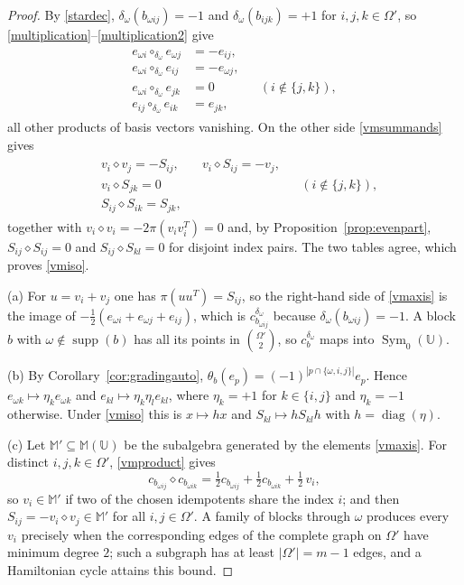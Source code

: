 \documentclass[times,11pt,reqno]{amsproc}
\theoremstyle{definition}
\numberwithin{equation}{section}
\def\ualg{\mathbb{U}}
\DeclareMathOperator{\supp}{supp}
\DeclareMathOperator{\Sym}{Sym}
\def\ualg{\mathbb{U}}
\def\malg{\mathbb{M}}
\newcommand{\vm}[1]{\malg(#1)}
\newcommand{\refl}{h}
\begin{document}
\begin{proof}
By \eqref{stardec}, $\delta_\omega(b_{\omega ij})=-1$ and
$\delta_\omega(b_{ijk})=+1$ for $i,j,k\in\Omega'$, so
\eqref{multiplication}--\eqref{multiplication2} give
\begin{align}
\begin{aligned}
e_{\omega i}\circ_{\delta_\omega} e_{\omega j}&=-e_{ij},
\\
e_{\omega i}\circ_{\delta_\omega} e_{ij}&=-e_{\omega j},
\\
e_{\omega i}\circ_{\delta_\omega} e_{jk}&=0&& (i\notin\{j,k\}),
\\
e_{ij}\circ_{\delta_\omega} e_{ik}&=e_{jk},
\end{aligned}
\end{align}
all other products of basis vectors vanishing. On the other side
\eqref{vmsummands} gives
\begin{align}
\begin{aligned}
&v_i\diamond v_j=-S_{ij},&&
v_i\diamond S_{ij}=-v_j,
\\
&v_i\diamond S_{jk}=0&& &&(i\notin\{j,k\}),
\\
&S_{ij}\diamond S_{ik}=S_{jk},
\end{aligned}
\end{align}
together with $v_i\diamond v_i=-2\pi(v_iv_i^{T})=0$ and, by
Proposition~\ref{prop:evenpart}, $S_{ij}\diamond S_{ij}=0$ and
$S_{ij}\diamond S_{kl}=0$ for disjoint index pairs. The two tables agree,
which proves \eqref{vmiso}.


(a) For $u=v_i+v_j$ one has $\pi(uu^{T})=S_{ij}$, so the right-hand side
of \eqref{vmaxis} is the image of
$-\tfrac12(e_{\omega i}+e_{\omega j}+e_{ij})$, which is
$c^{\delta_\omega}_{b_{\omega ij}}$ because
$\delta_\omega(b_{\omega ij})=-1$. A block $b$ with $\omega\notin\supp(b)$
has all its points in $\binom{\Omega'}{2}$, so $c_b^{\delta_\omega}$ maps
into $\Sym_0(\ualg)$.

(b) By Corollary~\ref{cor:gradingauto},
$\theta_b(e_p)=(-1)^{|p\cap\{\omega,i,j\}|}e_p$. Hence
$e_{\omega k}\mapsto\eta_k e_{\omega k}$ and
$e_{kl}\mapsto\eta_k\eta_l e_{kl}$, where $\eta_k=+1$ for $k\in\{i,j\}$
and $\eta_k=-1$ otherwise. Under \eqref{vmiso} this is $x\mapsto {\refl}x$ and
$S_{kl}\mapsto {\refl}S_{kl}{\refl}$ with ${\refl}=\operatorname{diag}(\eta)$.

(c) Let $\malg'\subseteq\vm{\ualg}$ be the subalgebra generated by the
elements \eqref{vmaxis}. For distinct $i,j,k\in\Omega'$,
\eqref{vmproduct} gives
$$
c_{b_{\omega ij}}\diamond c_{b_{\omega ik}}
=
\tfrac12 c_{b_{\omega ij}}+\tfrac12 c_{b_{\omega ik}}+\tfrac12\,v_i ,
$$
so $v_i\in\malg'$ if two of the chosen idempotents share the
index $i$; and then $S_{ij}=-v_i\diamond v_j\in\malg'$ for all
$i,j\in\Omega'$. A family of blocks through $\omega$ produces every
$v_i$ precisely when the corresponding edges of the complete graph on
$\Omega'$ have minimum degree $2$; such a subgraph has at least
$|\Omega'|=m-1$ edges, and a Hamiltonian cycle attains this bound.
\end{proof}
\end{document}
